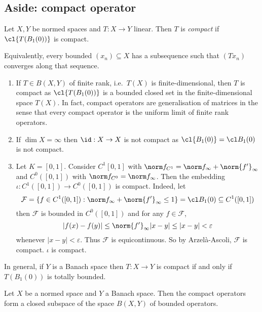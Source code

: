 \documentclass[a4paper]{article}
\begin{document}
\subsection{Aside: compact operator}

\begin{definition}
  Let \(X, Y\) be normed spaces and \(T: X \to Y\) linear. Then \(T\) is \emph{compact} if \(\cl{T(B_1(0))}\) is compact.
\end{definition}

Equivalently, every bounded \((x_n) \subseteq X\) has a subsequence such that \((Tx_n)\) converges along that sequence.

\begin{eg}\leavevmode
  \begin{enumerate}
  \item If \(T \in B(X, Y)\) of finite rank, i.e.\ \(T(X)\) is finite-dimensional, then \(T\) is compact as \(\cl{T(B_1(0))}\) is a bounded closed set in the finite-dimensional space \(T(X)\). In fact, compact operators are generalisation of matrices in the sense that every compact operator is the uniform limit of finite rank operators.
  \item If \(\dim X = \infty\) then \(\id: X \to X\) is not compact as \(\cl{B_1(0)} = \cl B_1(0)\) is not compact.
  \item Let \(K = [0, 1]\). Consider \(C^1[0, 1]\) with \(\norm f_{C^1} = \norm f_\infty + \norm{f'}_\infty\) and \(C^0([0, 1])\) with \(\norm f_{C^0} = \norm f_\infty\). Then the embedding \(\iota: C^1([0, 1]) \to C^0([0, 1])\) is compact. Indeed, let
    \[
      \mathcal F = \{f \in C^1([0, 1]): \norm f_\infty + \norm{f'}_\infty \leq 1 \} = \cl B_1(0) \subseteq C^1([0, 1])
    \]
    then \(\mathcal F\) is bounded in \(C^0([0, 1])\) and for any \(f \in \mathcal F\),
    \[
      |f(x) - f(y)|
      \leq \norm{f'}_\infty |x - y|
      \leq |x - y|
      < \varepsilon
    \]
    whenever \(|x - y| < \varepsilon\). Thus \(\mathcal F\) is equicontinuous. So by Arzelà-Ascoli, \(\mathcal F\) is compact. \(\iota\) is compact.
  \end{enumerate}
\end{eg}

In general, if \(Y\) is a Banach space then \(T: X \to Y\) is compact if and only if \(T(B_1(0))\) is totally bounded.

\begin{theorem}
  Let \(X\) be a normed space and \(Y\) a Banach space. Then the compact operators form a closed subspace of the space \(B(X, Y)\) of bounded operators.
\end{theorem}
\end{document}
